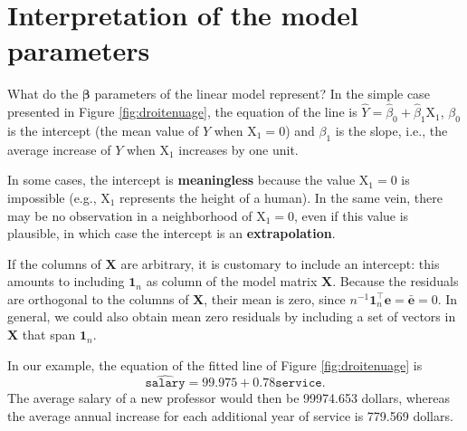 \documentclass[
  11pt,
  letterpaper,
]{book}
\theoremstyle{definition}
\theoremstyle{definition}
\theoremstyle{definition}
\theoremstyle{definition}
\theoremstyle{remark}
\begin{document}
\hypertarget{interpretation-of-the-model-parameters}{%
\section{Interpretation of the model parameters}\label{interpretation-of-the-model-parameters}}

What do the \(\boldsymbol{\beta}\) parameters of the linear model represent? In the simple case presented in Figure \ref{fig:droitenuage}, the equation of the line is \(\widehat{Y} = \widehat{\beta}_0 + \widehat{\beta}_1\mathrm{X}_1\), \(\beta_0\) is the intercept (the mean value of \(Y\) when \(\mathrm{X}_1=0\)) and \(\beta_1\) is the slope, i.e., the average increase of \(Y\) when \(\mathrm{X}_1\) increases by one unit.

In some cases, the intercept is \textbf{meaningless} because the value \(\mathrm{X}_1=0\) is impossible (e.g., \(\mathrm{X}_1\) represents the height of a human). In the same vein, there may be no observation in a neighborhood of \(\mathrm{X}_1=0\), even if this value is plausible, in which case the intercept is an \textbf{extrapolation}.

If the columns of \(\mathbf{X}\) are arbitrary, it is customary to include an intercept: this amounts to including \(\mathbf{1}_n\) as column of the model matrix \(\mathbf{X}\). Because the residuals are orthogonal to the columns of \(\mathbf{X}\), their mean is zero, since \(n^{-1}\mathbf{1}_n^\top\boldsymbol{e}=\bar{\boldsymbol{e}}=0\). In general, we could also obtain mean zero residuals by including a set of vectors in \(\mathbf{X}\) that span \(\mathbf{1}_n\).

In our example, the equation of the fitted line of Figure \ref{fig:droitenuage} is \[\widehat{\texttt{salary}} = 99.975 + 0.78\texttt{service}.\]
The average salary of a new professor would then be 99974.653 dollars, whereas the average annual increase for each additional year of service is 779.569 dollars.
\end{document}
